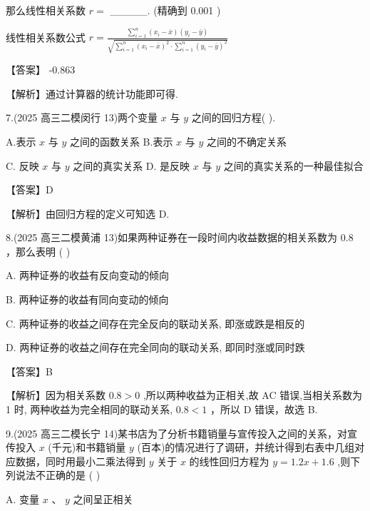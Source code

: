 \documentclass[10pt]{article}
\begin{document}
那么线性相关系数 \(r =\) \_\_\_\_\_. (精确到 0.001 )

线性相关系数公式 \(r = \frac{\mathop{\sum }\limits_{{i = 1}}^{n}\left( {{x}_{i} - \bar{x}}\right) \left( {{y}_{i} - \bar{y}}\right) }{\sqrt{\mathop{\sum }\limits_{{i = 1}}^{n}{\left( {x}_{i} - \bar{x}\right) }^{2} \cdot  \mathop{\sum }\limits_{{i = 1}}^{n}{\left( {y}_{i} - \bar{y}\right) }^{2}}}\)

【答案】 -0.863

【解析】通过计算器的统计功能即可得.

7.(2025 高三二模闵行 13)两个变量 \(x\) 与 \(y\) 之间的回归方程( ).

A.表示 \(x\) 与 \(y\) 之间的函数关系 B.表示 \(x\) 与 \(y\) 之间的不确定关系

C. 反映 \(x\) 与 \(y\) 之间的真实关系 D. 是反映 \(x\) 与 \(y\) 之间的真实关系的一种最佳拟合

【答案】D

【解析】由回归方程的定义可知选 D.

8.(2025 高三二模黄浦 13)如果两种证券在一段时间内收益数据的相关系数为 0.8 ，那么表明 ( )

A. 两种证券的收益有反向变动的倾向

B. 两种证券的收益有同向变动的倾向

C. 两种证券的收益之间存在完全反向的联动关系, 即涨或跌是相反的

D. 两种证券的收益之间存在完全同向的联动关系, 即同时涨或同时跌

【答案】B

【解析】因为相关系数 \({0.8} > 0\) ,所以两种收益为正相关,故 AC 错误,当相关系数为 1 时, 两种收益为完全相同的联动关系, \({0.8} < 1\) ，所以 D 错误，故选 B.

9.(2025 高三二模长宁 14)某书店为了分析书籍销量与宣传投入之间的关系，对宣传投入 \(x\) (千元)和书籍销量 \(y\) (百本)的情况进行了调研，并统计得到右表中几组对应数据，同时用最小二乘法得到 \(y\) 关于 \(x\) 的线性回归方程为 \(y = {1.2x} + {1.6}\) ,则下列说法不正确的是 ( )

\begin{center}
\end{center}

A. 变量 \(x\) 、 \(y\) 之间呈正相关
\end{document}

